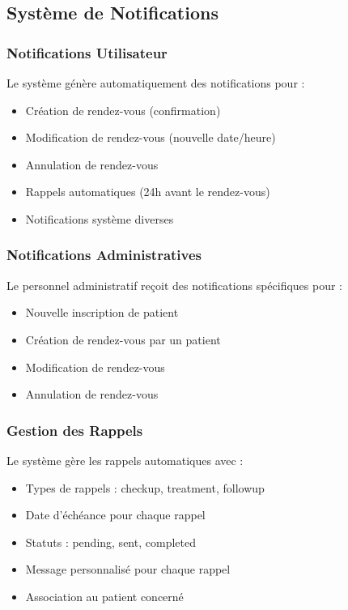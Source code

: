 \documentclass[12pt,a4paper]{report}
\begin{document}
\subsection{Système de Notifications}

\subsubsection{Notifications Utilisateur}

Le système génère automatiquement des notifications pour :
\begin{itemize}
    \item Création de rendez-vous (confirmation)
    \item Modification de rendez-vous (nouvelle date/heure)
    \item Annulation de rendez-vous
    \item Rappels automatiques (24h avant le rendez-vous)
    \item Notifications système diverses
\end{itemize}

\subsubsection{Notifications Administratives}

Le personnel administratif reçoit des notifications spécifiques pour :
\begin{itemize}
    \item Nouvelle inscription de patient
    \item Création de rendez-vous par un patient
    \item Modification de rendez-vous
    \item Annulation de rendez-vous
\end{itemize}

\subsubsection{Gestion des Rappels}

Le système gère les rappels automatiques avec :
\begin{itemize}
    \item Types de rappels : checkup, treatment, followup
    \item Date d'échéance pour chaque rappel
    \item Statuts : pending, sent, completed
    \item Message personnalisé pour chaque rappel
    \item Association au patient concerné
\end{itemize}
\end{document}
